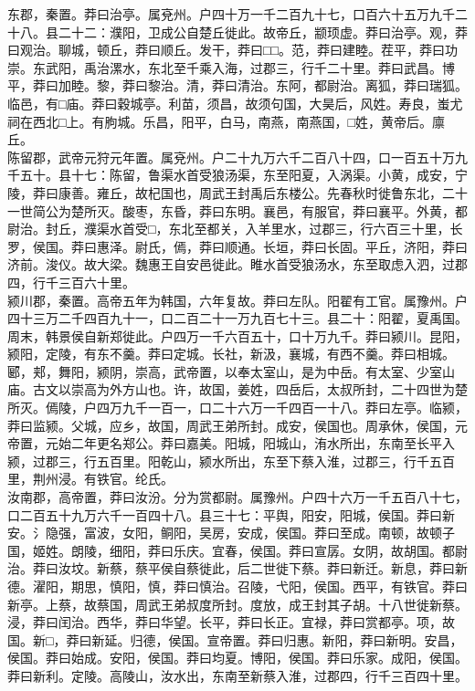 \documentclass[]{article}
\begin{document}
东郡，秦置。莽曰治亭。属兗州。户四十万一千二百九十七，口百六十五万九千二十八。县二十二：濮阳，卫成公自楚丘徙此。故帝丘，颛顼虚。莽曰治亭。观，莽曰观治。聊城，顿丘，莽曰顺丘。发干，莽曰□□。范，莽曰建睦。茬平，莽曰功崇。东武阳，禹治漯水，东北至千乘入海，过郡三，行千二十里。莽曰武昌。博平，莽曰加睦。黎，莽曰黎治。清，莽曰清治。东阿，都尉治。离狐，莽曰瑞狐。临邑，有□庙。莽曰穀城亭。利苗，须昌，故须句国，大昊后，风姓。寿良，蚩尤祠在西北□上。有朐城。乐昌，阳平，白马，南燕，南燕国，□姓，黄帝后。廪丘。\\
陈留郡，武帝元狩元年置。属兗州。户二十九万六千二百八十四，口一百五十万九千五十。县十七：陈留，鲁渠水首受狼汤渠，东至阳夏，入涡渠。小黄，成安，宁陵，莽曰康善。雍丘，故杞国也，周武王封禹后东楼公。先春秋时徙鲁东北，二十一世简公为楚所灭。酸枣，东昏，莽曰东明。襄邑，有服官，莽曰襄平。外黄，都尉治。封丘，濮渠水首受□，东北至都关，入羊里水，过郡三，行六百三十里，长罗，侯国。莽曰惠泽。尉氏，傿，莽曰顺通。长垣，莽曰长固。平丘，济阳，莽曰济前。浚仪。故大梁。魏惠王自安邑徙此。睢水首受狼汤水，东至取虑入泗，过郡四，行千三百六十里。\\
颍川郡，秦置。高帝五年为韩国，六年复故。莽曰左队。阳翟有工官。属豫州。户四十三万二千四百九十一，口二百二十一万九百七十三。县二十：阳翟，夏禹国。周末，韩景侯自新郑徙此。户四万一千六百五十，口十万九千。莽曰颍川。昆阳，颍阳，定陵，有东不羹。莽曰定城。长社，新汲，襄城，有西不羹。莽曰相城。郾，郏，舞阳，颍阴，崇高，武帝置，以奉太室山，是为中岳。有太室、少室山庙。古文以崇高为外方山也。许，故国，姜姓，四岳后，太叔所封，二十四世为楚所灭。傿陵，户四万九千一百一，口二十六万一千四百一十八。莽曰左亭。临颍，莽曰监颍。父城，应乡，故国，周武王弟所封。成安，侯国也。周承休，侯国，元帝置，元始二年更名郑公。莽曰嘉美。阳城，阳城山，洧水所出，东南至长平入颍，过郡三，行五百里。阳乾山，颍水所出，东至下蔡入淮，过郡三，行千五百里，荆州浸。有铁官。纶氏。\\
汝南郡，高帝置，莽曰汝汾。分为赏都尉。属豫州。户四十六万一千五百八十七，口二百五十九万六千一百四十八。县三十七：平舆，阳安，阳城，侯国。莽曰新安。氵隐强，富波，女阳，鲖阳，吴房，安成，侯国。莽曰至成。南顿，故顿子国，姬姓。朗陵，细阳，莽曰乐庆。宜春，侯国。莽曰宣孱。女阴，故胡国。都尉治。莽曰汝坟。新蔡，蔡平侯自蔡徙此，后二世徙下蔡。莽曰新迁。新息，莽曰新德。濯阳，期思，慎阳，慎，莽曰慎治。召陵，弋阳，侯国。西平，有铁官。莽曰新亭。上蔡，故蔡国，周武王弟叔度所封。度放，成王封其子胡。十八世徙新蔡。浸，莽曰闰治。西华，莽曰华望。长平，莽曰长正。宜禄，莽曰赏都亭。项，故国。新□，莽曰新延。归德，侯国。宣帝置。莽曰归惠。新阳，莽曰新明。安昌，侯国。莽曰始成。安阳，侯国。莽曰均夏。博阳，侯国。莽曰乐家。成阳，侯国。莽曰新利。定陵。高陵山，汝水出，东南至新蔡入淮，过郡四，行千三百四十里。\\
\end{document}
